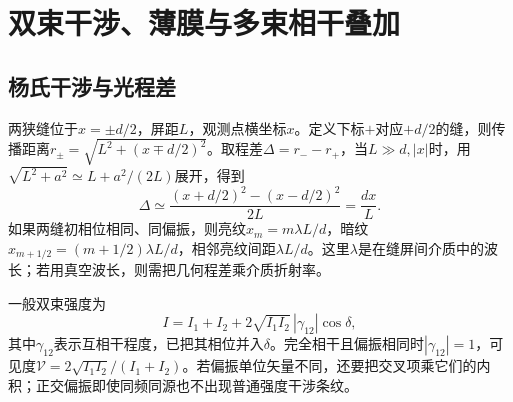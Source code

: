 \chapter{双束干涉、薄膜与多束相干叠加}
\section{杨氏干涉与光程差}\label{th:o2young}
两狭缝位于$x=\pm d/2$，屏距$L$，观测点横坐标$x$。定义下标$+$对应$+d/2$的缝，则传播距离$r_\pm=\sqrt{L^2+(x\mp d/2)^2}$。取程差$\Delta=r_--r_+$，当$L\gg d,|x|$时，用$\sqrt{L^2+a^2}\simeq L+a^2/(2L)$展开，得到
\[
 \Delta\simeq\frac{(x+d/2)^2-(x-d/2)^2}{2L}=\frac{dx}{L}.
\]
如果两缝初相位相同、同偏振，则亮纹$x_m=m\lambda L/d$，暗纹$x_{m+1/2}=(m+1/2)\lambda L/d$，相邻亮纹间距$\lambda L/d$。这里$\lambda$是在缝屏间介质中的波长；若用真空波长，则需把几何程差乘介质折射率。

一般双束强度为
\begin{equation}\label{eq:o2two}
 I=I_1+I_2+2\sqrt{I_1I_2}\,|\gamma_{12}|\cos\delta,
\end{equation}
其中$\gamma_{12}$表示互相干程度，已把其相位并入$\delta$。完全相干且偏振相同时$|\gamma_{12}|=1$，可见度$\mathcal V=2\sqrt{I_1I_2}/(I_1+I_2)$。若偏振单位矢量不同，还要把交叉项乘它们的内积；正交偏振即使同频同源也不出现普通强度干涉条纹。


